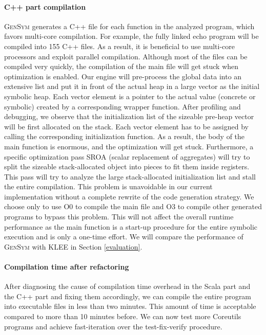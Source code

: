 \documentclass[sigplan, nonacm]{acmart}\settopmatter{printfolios=true,printccs=false,printacmref=false}
\newcommand{\tool}{\textsc{GenSym}\xspace}
\begin{document}
\paragraph*{C++ part compilation}
\tool generates a C++ file for each function in the analyzed program, which favors multi-core compilation. For example, the fully linked echo program will be compiled into 155 C++ files. As a result, it is beneficial to use multi-core processors and exploit parallel compilation. Although most of the files can be compiled very quickly, the compilation of the main file will get stuck when optimization is enabled. Our engine will pre-process the global data into an extensive list and put it in front of the actual heap in a large vector as the initial symbolic heap. Each vector element is a pointer to the actual value (concrete or symbolic) created by a corresponding wrapper function. After profiling and debugging, we observe that the initialization list of the sizeable pre-heap vector will be first allocated on the stack. Each vector element has to be assigned by calling the corresponding initialization function. As a result, the body of the main function is enormous, and the optimization will get stuck. Furthermore, a specific optimization pass SROA (scalar replacement of aggregates) will try to split the sizeable stack-allocated object into pieces to fit them inside registers. This pass will try to analyze the large stack-allocated initialization list and stall the entire compilation. This problem is unavoidable in our current implementation without a complete rewrite of the code generation strategy. We choose only to use O0 to compile the main file and O3 to compile other generated programs to bypass this problem. This will not affect the overall runtime performance as the main function is a start-up procedure for the entire symbolic execution and is only a one-time effort. We will compare the performance of \tool with KLEE in Section \ref{evaluation}.
\paragraph*{Compilation time after refactoring}
After diagnosing the cause of compilation time overhead in the Scala part and the C++ part and fixing them accordingly, we can compile the entire program into executable files in less than two minutes. This amount of time is acceptable compared to more than 10 minutes before. We can now test more Coreutils programs and achieve fast-iteration over the test-fix-verify procedure.
\end{document}
